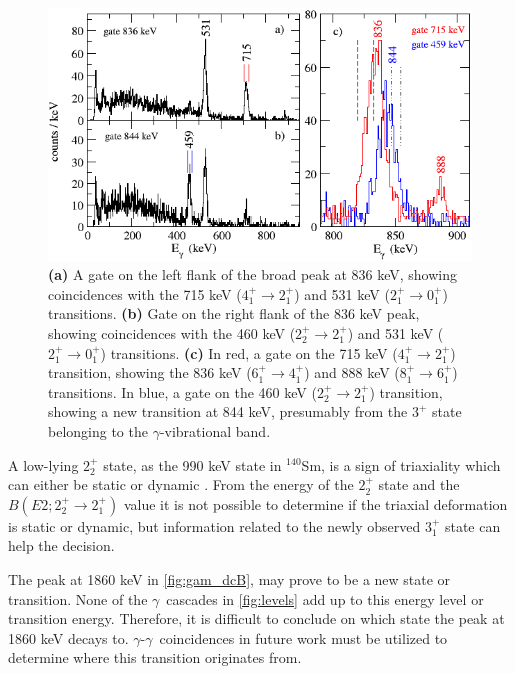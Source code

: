 \documentclass[twoside,english]{uiofysmaster/uiofysmaster}
\newcommand{\Sm}{$^{140}$Sm} %
\newcommand{\ga}{$\gamma$}
\let\orgautoref\autoref
\renewcommand{\autoref}
        {%
		 \def\sectionautorefname{Section}%
		 \def\subsectionautorefname{Section}%
		 \def\subsubsectionautorefname{Section}%
		 \def\chapterautorefname{Chapter}%
          \orgautoref}
\begin{document}
\begin{figure}[htb]
	\centering
	\includegraphics[width=\textwidth]{Images/check_state.png}
	\caption{\textbf{(a)} A gate on the left flank of the broad peak at 836 keV, showing coincidences with the 715 keV ($4_1^+ \rightarrow 2_1^+$) and 531 keV ($2_1^+ \rightarrow 0_1^+$) transitions.
	\textbf{(b)} Gate on the right flank of the 836 keV peak, showing coincidences with the 460 keV ($2_2^+ \rightarrow 2_1^+$) and 531 keV ($2_1^+ \rightarrow 0_1^+$) transitions.
	\textbf{(c)} In red, a gate on the 715 keV ($4_1^+ \rightarrow 2_1^+$) transition, showing the 836 keV ($6_1^+ \rightarrow 4_1^+$) and 888 keV ($8_1^+ \rightarrow 6_1^+$) transitions. In blue, a gate on the 460 keV ($2_2^+ \rightarrow 2_1^+$) transition, showing a new transition at 844 keV, presumably from the $3^+$ state belonging to the \ga-vibrational band.}
	\label{fig:check_state}
\end{figure}


A low-lying $2_2^+$ state, as the 990 keV state in \Sm, is a sign of triaxiality which can either be static or dynamic \cite{Klintefjord2016}.
From the energy of the $2_2^+$ state and the $B(E2; 2_2^+ \rightarrow 2_1^+)$ value it is not possible to determine if the triaxial deformation is static or dynamic, but information related to the newly observed $3_1^+$ state can help the decision.

The peak at 1860 keV in \autoref{fig:gam_dcB}, may prove to be a new state or transition. 
None of the \ga\ cascades in \autoref{fig:levels} add up to this energy level or transition energy. 
Therefore, it is difficult to conclude on which state the peak at 1860 keV decays to.
\ga-\ga\ coincidences in future work must be utilized to determine where this transition originates from.
\end{document}
